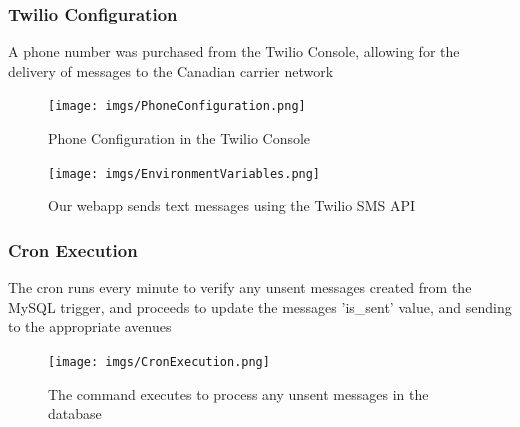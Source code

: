 \subsubsection{Twilio Configuration}

A phone number was purchased from the Twilio Console, allowing for the delivery of messages to the Canadian carrier network

\begin{figure}[h]
    \centering
    \texttt{[image: imgs/PhoneConfiguration.png]}
    \caption{Phone Configuration in the Twilio Console}
\end{figure}

\begin{figure}[h]
    \centering
    \texttt{[image: imgs/EnvironmentVariables.png]}
    \caption{Our webapp sends text messages using the Twilio SMS API}
\end{figure}
\subsubsection{Cron Execution}

The cron runs every minute to verify any unsent messages created from the MySQL trigger, and proceeds to update the messages 'is\_sent' value, and sending to the appropriate avenues

\begin{figure}[h]
    \centering
    \texttt{[image: imgs/CronExecution.png]}
    \caption{The command executes to process any unsent messages in the database}
\end{figure}

